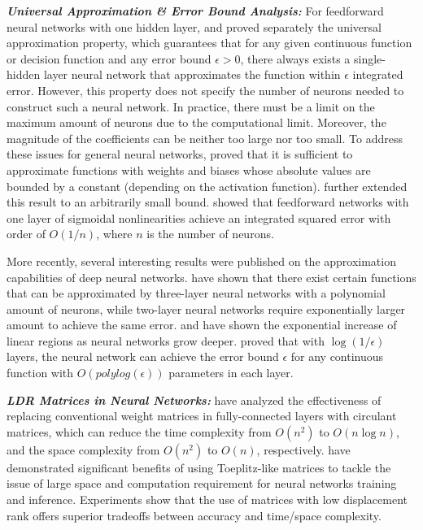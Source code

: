 \documentclass{article}
\begin{document}
\textbf{\textit{Universal Approximation \& Error Bound Analysis: }}For feedforward neural networks with one hidden layer, \cite{cybenko1989approximation} and \cite{hornik1989multilayer} proved separately the universal approximation property, which guarantees that for any given continuous function or decision function and any error bound $\epsilon>0$, there always exists a single-hidden layer neural network that approximates the function within $\epsilon$ integrated error. However, this property does not specify the number of neurons needed to construct such a neural network. In practice, there must be a limit on the maximum amount of neurons due to the computational limit. Moreover, the magnitude of the coefficients can be neither too large nor too small. To address these issues for general neural networks, \cite{hornik1989multilayer} proved that it is sufficient to approximate functions with weights and biases whose absolute values are bounded by a constant (depending on the activation function). \cite{hornik1991approximation} further extended this result to an arbitrarily small bound. \cite{barron1993universal}
showed that feedforward networks with one layer of sigmoidal nonlinearities achieve an integrated squared error with order of $O(1/n)$, where $n$ is the number of neurons.

More recently, several interesting results were published on the approximation capabilities of deep neural networks. \cite{delalleau2011shallow} have shown that there exist certain functions that can be approximated by three-layer neural networks with a polynomial amount of neurons, while two-layer neural networks require exponentially larger amount to achieve the same error. \cite{montufar2014number} and \cite{telgarsky2016benefits} have shown the exponential increase of linear regions as neural networks grow deeper. \cite{liang2016deep} proved that with $\log(1/\epsilon)$ layers, the neural network can achieve the error bound $\epsilon$ for any continuous function with $O(polylog (\epsilon))$ parameters in each layer.

\textbf{\textit{LDR Matrices in Neural Networks: }}\cite{cheng2015exploration} have analyzed the effectiveness of replacing conventional weight matrices in fully-connected layers with circulant matrices, which can reduce the time complexity from $O(n^2)$ to $O(n\log n)$, and the space complexity from $O(n^2)$ to $O(n)$, respectively. \cite{sindhwani2015structured} have demonstrated significant benefits of using Toeplitz-like matrices to tackle the issue of large space and computation requirement for neural networks training and inference. Experiments show that the use of matrices with low displacement rank offers superior tradeoffs between accuracy and time/space complexity.
\end{document}

